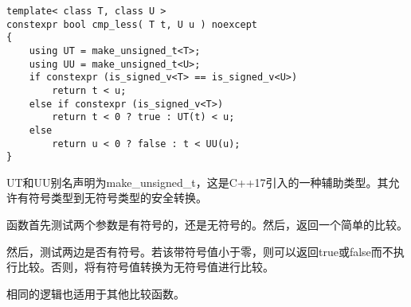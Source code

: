 \begin{lstlisting}[style=styleCXX]
template< class T, class U >
constexpr bool cmp_less( T t, U u ) noexcept
{
	using UT = make_unsigned_t<T>;
	using UU = make_unsigned_t<U>;
	if constexpr (is_signed_v<T> == is_signed_v<U>)
		return t < u;
	else if constexpr (is_signed_v<T>)
		return t < 0 ? true : UT(t) < u;
	else
		return u < 0 ? false : t < UU(u);
}
\end{lstlisting}

UT和UU别名声明为make\_unsigned\_t，这是C++17引入的一种辅助类型。其允许有符号类型到无符号类型的安全转换。

函数首先测试两个参数是有符号的，还是无符号的。然后，返回一个简单的比较。

然后，测试两边是否有符号。若该带符号值小于零，则可以返回true或false而不执行比较。否则，将有符号值转换为无符号值进行比较。

相同的逻辑也适用于其他比较函数。















